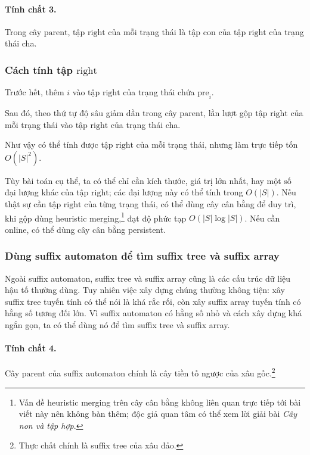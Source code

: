 \documentclass[11pt]{article}
\begin{document}
\paragraph{Tính chất 3.}
Trong cây \(\mathrm{parent}\), tập \(\mathrm{right}\) của mỗi trạng thái là tập
con của tập \(\mathrm{right}\) của trạng thái cha.

\subsubsection{Cách tính tập \texorpdfstring{\(\mathrm{right}\)}{right}}

Trước hết, thêm \(i\) vào tập \(\mathrm{right}\) của trạng thái chứa
\(\mathrm{pre}_i\).

Sau đó, theo thứ tự độ sâu giảm dần trong cây \(\mathrm{parent}\), lần lượt gộp
tập \(\mathrm{right}\) của mỗi trạng thái vào tập \(\mathrm{right}\) của trạng
thái cha.

Như vậy có thể tính được tập \(\mathrm{right}\) của mỗi trạng thái, nhưng làm
trực tiếp tốn \(O(|S|^2)\).

Tùy bài toán cụ thể, ta có thể chỉ cần kích thước, giá trị lớn nhất, hay một số
đại lượng khác của tập \(\mathrm{right}\); các đại lượng này có thể tính trong
\(O(|S|)\). Nếu thật sự cần tập \(\mathrm{right}\) của từng trạng thái, có thể
dùng cây cân bằng để duy trì, khi gộp dùng heuristic merging,\footnote{Vấn đề
heuristic merging trên cây cân bằng không liên quan trực tiếp tới bài viết này
nên không bàn thêm; độc giả quan tâm có thể xem lời giải bài \emph{Cây non và
tập hợp}.} đạt độ phức tạp \(O(|S|\log |S|)\). Nếu cần online, có thể dùng cây
cân bằng persistent.

\subsubsection{Dùng suffix automaton để tìm suffix tree và suffix array}

Ngoài suffix automaton, suffix tree và suffix array cũng là các cấu trúc dữ
liệu hậu tố thường dùng. Tuy nhiên việc xây dựng chúng thường không tiện:
xây suffix tree tuyến tính có thể nói là khá rắc rối, còn xây suffix array
tuyến tính có hằng số tương đối lớn. Vì suffix automaton có hằng số nhỏ và cách
xây dựng khá ngắn gọn, ta có thể dùng nó để tìm suffix tree và suffix array.

\paragraph{Tính chất 4.}
Cây \(\mathrm{parent}\) của suffix automaton chính là cây tiền tố ngược của xâu
gốc.\footnote{Thực chất chính là suffix tree của xâu đảo.}
\end{document}
